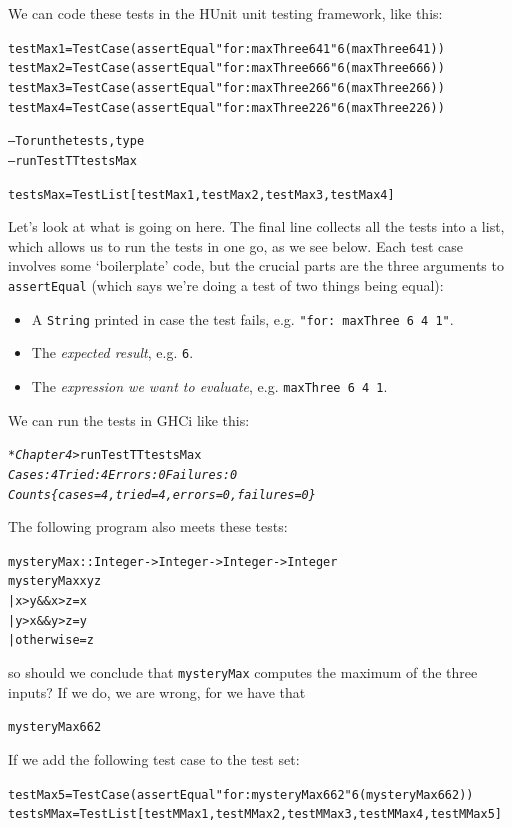 We can code these tests in the HUnit unit testing framework, like this:
\begin{alltt}
testMax1 = TestCase (assertEqual "for: maxThree 6 4 1" 6 (maxThree 6 4 1))
testMax2 = TestCase (assertEqual "for: maxThree 6 6 6" 6 (maxThree 6 6 6))
testMax3 = TestCase (assertEqual "for: maxThree 2 6 6" 6 (maxThree 2 6 6))
testMax4 = TestCase (assertEqual "for: maxThree 2 2 6" 6 (maxThree 2 2 6))

-- To run the tests, type 
--   runTestTT testsMax

testsMax = TestList [testMax1, testMax2, testMax3, testMax4]
\end{alltt}
Let's look at what is going on here. The final line collects all the tests into a list, which allows us to run the tests in one go, as we see below. Each test case involves some `boilerplate' code, but the crucial parts are the three arguments to \texttt{assertEqual} (which says we're doing a test of two things being equal):
\begin{itemize}
\item 
A \texttt{String} printed in case the test fails, e.g. \texttt{"for:\ maxThree 6 4 1"}.
\item
The \emph{expected result}, e.g. \texttt{6}.
\item
The \emph{expression we want to evaluate}, e.g. \texttt{maxThree 6 4 1}.
\end{itemize}
We can run the tests in GHCi like this: 
\begin{alltt}
\textsl{*Chapter4>} runTestTT testsMax
\textsl{Cases: 4  Tried: 4  Errors: 0  Failures: 0
Counts \{cases = 4, tried = 4, errors = 0, failures = 0\}}
\end{alltt}
The
following program also meets these tests:
\begin{alltt}
mysteryMax :: Integer -> Integer -> Integer -> Integer
mysteryMax x y z
  | x > y \&\& x > z      = x
  | y > x \&\& y > z      = y
  | otherwise           = z
\end{alltt}
so should we conclude that \texttt{mysteryMax} computes the maximum of the
three inputs? If we do, we are wrong, for we have that
\begin{alltt}
mysteryMax 6 6 2 
\end{alltt}
If we add the following test case to the test set:
\begin{alltt}
testMax5 = TestCase (assertEqual "for: mysteryMax 6 6 2" 6 (mysteryMax 6 6 2))
testsMMax = TestList [testMMax1, testMMax2, testMMax3, testMMax4, testMMax5]
\end{alltt}
